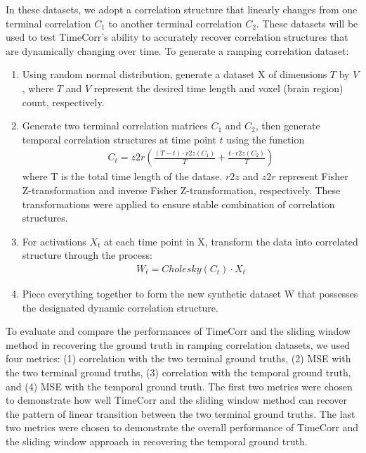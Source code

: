 \documentclass[11pt]{article}
\begin{document}
In these datasets, we adopt a correlation structure that linearly changes from one terminal correlation $C_1$ to another terminal correlation $C_2$. These datasets will be used to test TimeCorr's ability to accurately recover correlation structures that are dynamically changing over time. To generate a ramping correlation dataset:
\begin{enumerate}
\item Using random normal distribution, generate a dataset X of dimensions $T$ by $V$, where $T$ and $V$ represent the desired time length and voxel (brain region) count, respectively.
\item Generate two terminal correlation matrices $C_1$ and $C_2$, then generate temporal correlation structures at time point $t$ using the function
\begin{align*}
C_t = z2r(\frac{(T-t) \cdot r2z(C_1)}{T} + \frac{t\cdot r2z(C_2)}{T})
\end{align*}
where T is the total time length of the datase. $r2z$ and $z2r$ represent Fisher Z-transformation and inverse Fisher Z-transformation, respectively. These transformations were applied to ensure stable combination of correlation structures.
\item For activations $X_t$ at each time point in X, transform the data into correlated structure through the process:
\begin{align*}
W_t = Cholesky(C_t) \cdot X_t
\end{align*}
\item Piece everything together to form the new synthetic dataset W that possesses the designated dynamic correlation structure.
\end{enumerate}

To evaluate and compare the performances of TimeCorr and the sliding window method in recovering the ground truth in ramping correlation datasets, we used four metrics: (1) correlation with the two terminal ground truths, (2) MSE with the two terminal ground truths, (3) correlation with the temporal ground truth, and (4) MSE with the temporal ground truth. The first two metrics were chosen to demonstrate how well TimeCorr and the sliding window method can recover the pattern of linear transition between the two terminal ground truths. The last two metrics were chosen to demonstrate the overall performance of TimeCorr and the sliding window approach in recovering the temporal ground truth.
\end{document}
